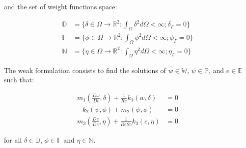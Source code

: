 \noindent
and the set of weight functions space:

\begin{equation}
 \begin{aligned}
  \mathbb{D} &= \{\delta \in \Omega \rightarrow \mathbb{R}^2
  : \int_\Omega \delta^2 d\Omega < \infty
  ; \delta_\Gamma = 0\} \\
  \mathbb{F} &= \{\phi \in \Omega \rightarrow \mathbb{R}^2
  : \int_\Omega \phi^2 d\Omega < \infty 
  ; \phi_\Gamma = 0\} \\
  \mathbb{N} &= \{\eta \in \Omega \rightarrow \mathbb{R}^2
  : \int_\Omega \eta^2 d\Omega < \infty 
  ; \eta_\Gamma = 0\}
 \end{aligned}
\end{equation}

\noindent
The weak formulation consists 
to find the solutions of 
$w \in \mathbb{W}$,
$\psi \in \mathbb{P}$, and $e \in \mathbb{E}$
such that:

\begin{align}
 \textbf{$m_1$}(\frac{D \omega}{Dt},\delta) 
 + \frac{1}{\textit{Re}}\textbf{$k_1$}(w,\delta) 
 & = 0 \\
 - \textbf{$k_2$}(\psi,\phi) 
 + \textbf{$m_2$}(\psi,\phi) 
 & = 0 \\
 \textbf{$m_3$}(\frac{De}{De},\eta) 
 + \frac{1}{\textit{ReSc}}\textbf{$k_3$}(e,\eta) 
 & = 0
\end{align}

\noindent
for all $\delta \in \mathbb{D}$, 
$\phi \in \mathbb{F}$ and 
$\eta \in \mathbb{N}$.

